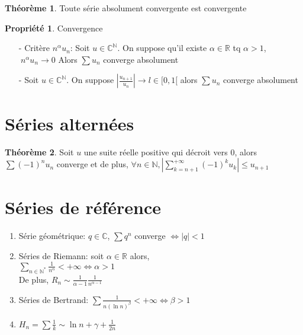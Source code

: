 \documentclass[fleqn]{article}
\theoremstyle{definition} \newtheorem*{defi}{D\'efinition}
\theoremstyle{definition} \newtheorem*{theo}{Th\'eor\`eme}
\theoremstyle{definition} \newtheorem*{coro}{Corollaire}
\theoremstyle{remark} \newtheorem*{rqs}{Remarques}
\theoremstyle{definition} \newtheorem*{prop}{Propri\'et\'e}
\begin{document}
\begin{theo} Toute s\'erie absolument convergente est convergente

\begin{prop} Convergence
	\begin{enumerate}
		\item [-] Crit\`ere $n^\alpha u_n$: Soit $u \in \mathbb{C}^\mathbb{N}$. On suppose qu'il existe $\alpha \in \mathbb{R}$ tq
			$\alpha > 1$, $\ n^\alpha u_n \rightarrow 0$ Alors $\sum u_n $ converge absolument
		\item [-] Soit $u \in \mathbb{C}^\mathbb{N}$. On suppose $|\frac{u_{n+1}}{u_n}| \rightarrow l \in [0,1[$ alors $\sum u_n$ converge
			absolument
	\end{enumerate}
\end{prop}

\end{theo}


\section{S\'eries altern\'ees}
\begin{theo}
	Soit $u$ une suite r\'eelle positive qui d\'ecroit vers $0$, alors $\sum (-1)^n u_n$ converge et de plus, $\forall n \in \mathbb{N},
	|\sum_{k=n+1}^{+\infty} (-1)^k u_k| \leq u_{n+1}$
\end{theo}


\section{S\'eries de r\'ef\'erence}
\begin{enumerate}
	\item S\'erie g\'eom\'etrique: $q \in \mathbb{C}$,  $\sum q^n$ converge $\Leftrightarrow |q| < 1$
	\item S\'eries de Riemann: soit $\alpha \in \mathbb{R}$ alors,\\
		$\sum_{n \in \mathbb{N}^*} \frac{1}{n^\alpha} < +\infty \Leftrightarrow \alpha > 1$ \\
		De plus, $R_n \sim \frac{1}{\alpha -1} \frac{1}{n^{\alpha -1}}$
	\item S\'eries de Bertrand: $\sum \frac{1}{n (\ln n)^\beta} < +\infty \Leftrightarrow \beta > 1$
	\item $H_n = \sum \frac{1}{k} \sim \ln n + \gamma + \frac{1}{2n}$
\end{enumerate}

\end{document}
